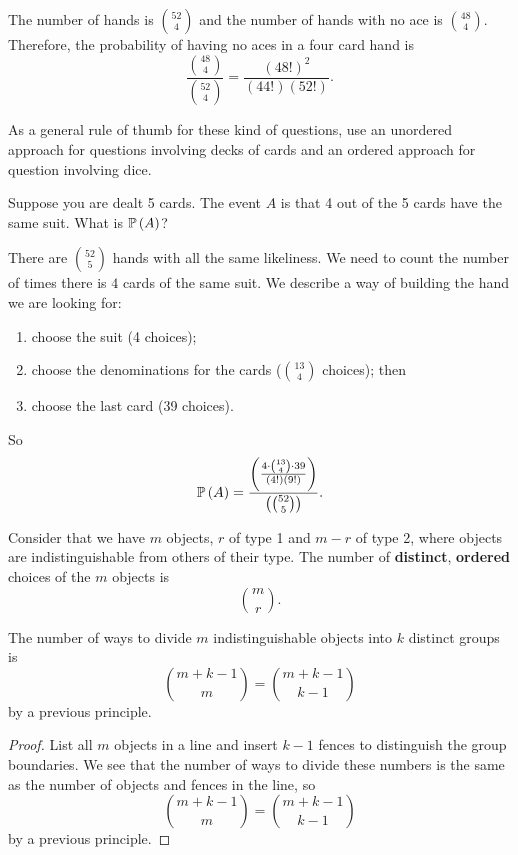 \begin{solution}
    The number of hands is $\binom{52}{4}$ and the number of hands with no ace is $\binom{48}{4}$. Therefore, the probability of having no aces in a four card hand is \[ \frac{\binom{48}{4}}{\binom{52}{4}} = \frac{(48!)^2}{(44!)(52!)}. \]
\end{solution}

\begin{remark}
    As a general rule of thumb for these kind of questions, use an unordered approach for questions involving decks of cards and an ordered approach for question involving dice.
\end{remark}

\begin{example}
    Suppose you are dealt 5 cards. The event $A$ is that 4 out of the 5 cards have the same suit. What is $\operatorname{\mathbb{P}}{(A)}$?
\end{example}

\begin{solution}
    There are $\binom{52}{5}$ hands with all the same likeliness. We need to count the number of times there is $4$ cards of the same suit. We describe a way of building the hand we are looking for:
    \begin{enumerate}
        \item choose the suit (4 choices);
        \item choose the denominations for the cards ($\binom{13}{4}$ choices); then
        \item choose the last card (39 choices).
    \end{enumerate}
    So \[ \operatorname{\mathbb{P}}{(A)} = \frac{ \left( \frac{4 \cdot \binom{13}{4} \cdot 39}{(4!)(9!)} \right) }{ \left( \binom{52}{5} \right) }. \]
\end{solution}

\begin{proposition}
    Consider that we have $m$ objects, $r$ of type 1 and $m - r$ of type 2, where objects are indistinguishable from others of their type. The number of \textbf{distinct}, \textbf{ordered} choices of the $m$ objects is \[ \binom{m}{r}. \]
\end{proposition}

\begin{proposition}
    The number of ways to divide $m$ indistinguishable objects into $k$ distinct groups is \[ \binom{m + k - 1}{m} = \binom{m + k - 1}{k - 1} \] by a previous principle.
\end{proposition}

\begin{proof}
    List all $m$ objects in a line and insert $k - 1$ fences to distinguish the group boundaries. We see that the number of ways to divide these numbers is the same as the number of objects and fences in the line, so \[ \binom{m + k - 1}{m} = \binom{m + k - 1}{k - 1} \] by a previous principle.
\end{proof}
